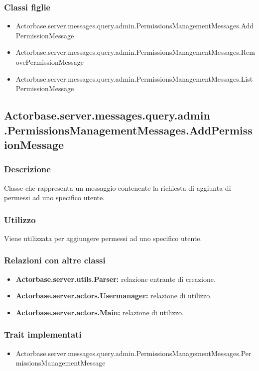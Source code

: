 \documentclass[a4paper]{article}
\begin{document}
			\subsubsection{Classi figlie}
				\begin{itemize}
					\item Actorbase.server.messages.query.admin.PermissionsManagementMessages.AddPermissionMessage
					\item Actorbase.server.messages.query.admin.PermissionsManagementMessages.RemovePermissionMessage
					\item Actorbase.server.messages.query.admin.PermissionsManagementMessages.ListPermissionMessage
				\end{itemize}
			
		\subsection{Actorbase.server.messages.query.admin \newline
		.PermissionsManagementMessages.AddPermissionMessage}
			\subsubsection{Descrizione}
				Classe che rappresenta un messaggio contenente la richiesta di aggiunta di permessi ad uno specifico utente.
				
			\subsubsection{Utilizzo}
				Viene utilizzata per aggiungere permessi ad uno specifico utente.
				
			\subsubsection{Relazioni con altre classi}
				\begin{itemize}
					\item \textbf{Actorbase.server.utils.Parser:} relazione entrante di creazione.
					\item \textbf{Actorbase.server.actors.Usermanager:} relazione di utilizzo.
					\item \textbf{Actorbase.server.actors.Main:} relazione di utilizzo.
				\end{itemize}
			\subsubsection{Trait implementati}
				\begin{itemize}
					\item Actorbase.server.messages.query.admin.PermissionsManagementMessages.PermissionsManagementMessage
				\end{itemize}
		
\end{document}
